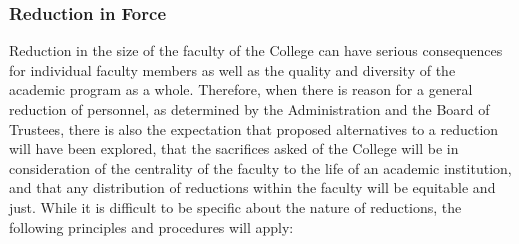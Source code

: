		\subsubsection{Reduction in Force}
			\label{sec:ReductionInForce}
			Reduction in the size of the faculty of the College can have serious consequences for individual faculty members as well as the quality and diversity of the academic program as a whole.  Therefore, when there is reason for a general reduction of personnel, as determined by the Administration and the Board of Trustees, there is also the expectation that proposed alternatives to a reduction will have been explored, that the sacrifices asked of the College will be in consideration of the centrality of the faculty to the life of an academic institution, and that any distribution of reductions within the faculty will be equitable and just.  While it is difficult to be specific about the nature of reductions, the following principles and procedures will apply:
